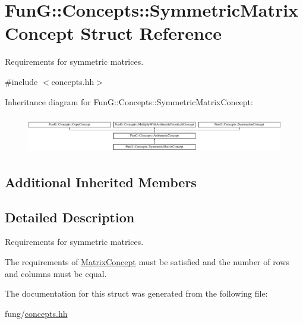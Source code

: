 \hypertarget{structFunG_1_1Concepts_1_1SymmetricMatrixConcept}{\section{Fun\-G\-:\-:Concepts\-:\-:Symmetric\-Matrix\-Concept Struct Reference}
\label{structFunG_1_1Concepts_1_1SymmetricMatrixConcept}
}


Requirements for symmetric matrices.  




{\ttfamily \#include $<$concepts.\-hh$>$}

Inheritance diagram for Fun\-G\-:\-:Concepts\-:\-:Symmetric\-Matrix\-Concept\-:\begin{figure}[H]
\begin{center}
\leavevmode
\includegraphics[height=1.661721cm]{structFunG_1_1Concepts_1_1SymmetricMatrixConcept}
\end{center}
\end{figure}
\subsection*{Additional Inherited Members}


\subsection{Detailed Description}
Requirements for symmetric matrices. 

The requirements of \hyperlink{structFunG_1_1Concepts_1_1MatrixConcept}{Matrix\-Concept} must be satisfied and the number of rows and columns must be equal. 

The documentation for this struct was generated from the following file\-:\begin{DoxyCompactItemize}
\item 
fung/\hyperlink{concepts_8hh}{concepts.\-hh}\end{DoxyCompactItemize}
